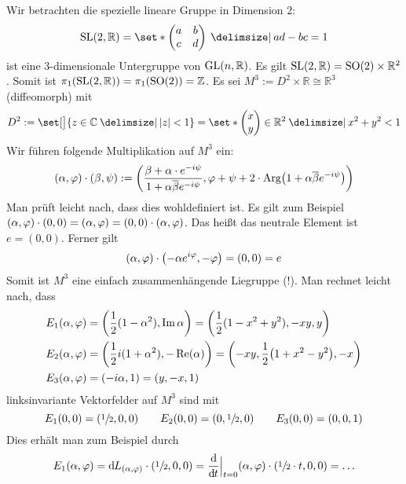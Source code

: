 \begin{beispiel*}[{name=[Überlagerung der speziellen linearen Gruppe]}]
	Wir betrachten die spezielle lineare Gruppe in Dimension $2$:
	\[
		\SL(2,\mathbb{R}) = \set*{\begin{pmatrix}
			a & b \\ c & d
		\end{pmatrix} \given ad - bc =1}
	\]
	ist eine 3-dimensionale Untergruppe von $\GL(n,\mathbb{R})$.
	Es gilt $\SL(2,\mathbb{R}) = \SO(2) \times \mathbb{R}^2$.
	Somit ist $\pi_1 \enbrace*{\SL(2,\mathbb{R})} = \pi_1 (\SO(2)) = \mathbb{Z}$.
	Es sei $M^3 := D^2 \times \mathbb{R} \cong \mathbb{R}^3$ (diffeomorph) mit
	\[
		D^2 := \set[\big]{z \in \mathbb{C} \given \abs*{z} <1} = \set*{\begin{pmatrix}
			x \\ y
		\end{pmatrix} \in \mathbb{R}^2 \given x^2 +y^2 <1}
	\]
	Wir führen folgende Multiplikation auf $M^3$ ein:
	\[
		(\alpha,\varphi) \cdot (\beta, \psi) := \enbrace*{ \frac{\beta + \alpha \cdot e^{-i \psi}}{1 + \alpha \overline{\beta} e^{-i \psi}}, \varphi + \psi + 2 \cdot \Arg \enbrace*{1 + \alpha \overline{\beta} e^{-i \psi}} }
	\]
	Man prüft leicht nach, dass dies wohldefiniert ist.
	Es gilt zum Beispiel $(\alpha,\varphi) \cdot (0,0) = \enbrace*{\alpha,\varphi} = (0,0) \cdot (\alpha,\varphi)$.
	Das heißt das neutrale Element ist $e=(0,0)$.
	Ferner gilt
	\[
		(\alpha,\varphi) \cdot \enbrace*{- \alpha e^{i \varphi}, -\varphi} = (0,0) = e
	\]
	Somit ist $M^3$ eine einfach zusammenhängende Liegruppe (!).
	Man rechnet leicht nach, dass 
	\begin{align}
		E_1(\alpha,\varphi) &= \enbrace*{\frac{1}{2}  (1- \alpha^2), \Im \alpha} = \enbrace*{\frac{1}{2} (1 -x^2 +y^2), -xy,y} \\
		E_2(\alpha,\varphi) &= \enbrace*{\frac{1}{2} i (1+ \alpha^2), - \Re(\alpha) } = \enbrace*{-xy, \frac{1}{2} \enbrace*{1+x^2 -y^2}, -x} \\
		E_3(\alpha,\varphi) &= \enbrace*{-i \alpha,1} = (y,-x,1)
	\end{align}
	linksinvariante Vektorfelder auf $M^3$ sind mit
	\[
		E_1(0,0) = \enbrace*{\sfrac{1}{2},0,0 } \qquad E_2(0,0) = \enbrace*{0, \sfrac{1}{2}, 0 } \qquad E_3(0,0) = (0,0,1)
	\]
	Dies erhält man zum Beispiel durch
	\[
		E_1(\alpha,\varphi) = \mathd L_{(\alpha,\varphi)} \cdot \enbrace*{\sfrac{1}{2},0,0} = \diffd{}{t}\Big|_{t=0} (\alpha,\varphi) \cdot \enbrace*{\sfrac{1}{2}\cdot t,0,0} = \ldots 
\]
\end{beispiel*}
